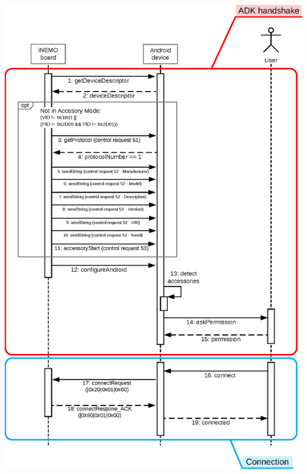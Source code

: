 \begin{center}
	\includegraphics[width=0.95\linewidth]{pics/adk_handshake.eps}
	\label{fig:adk_handshake}
\end{center}


